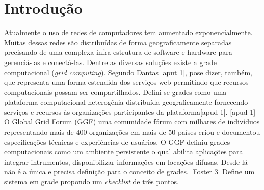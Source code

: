 \section*{Introdução}
\label{cap:introducao}

Atualmente o uso de redes de computadores tem aumentado exponencialmente. Muitas dessas redes são distribuídas de forma geograficamente separadas precisando de uma complexa infra-estrutura de software e hardware para gerenciá-las e conectá-las. Dentre as diversas soluções existe a grade computacional (\emph{grid computing}).
Segundo Dantas [aput 1], pose dizer, também, que representa uma forma estendida dos serviços web permitindo que recursos computacionais possam ser compartilhados.
Defini-se grades como uma plataforma computacional heterogênia distribuída geograficamente fornecendo serviços e recursos às organizações participantes da plataforma[apud 1].
[apud 1] O Global Grid Forum (GGF) uma comunidade fórum com milhares de indivíduos representando mais de 400 organizações em mais de 50 países criou e documentou especificações técnicas e experiências de usuários. O GGF definiu grades computacionais como um ambiente persistente o qual abilita aplicações para integrar intrumentos, disponibilizar informações em locações difusas. Desde lá não é a única e precisa definição para o conceito de grades. [Foster 3] Define um sistema em grade propondo um \emph{checklist} de três pontos.
